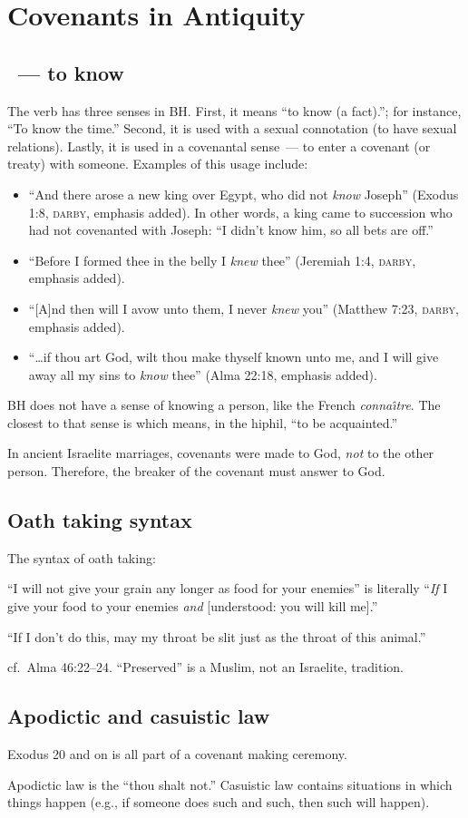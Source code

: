 \section{Covenants in Antiquity}\label{app:covenants-in-antiquity}
\subsection{~--- to know}
The verb  has three senses in BH. First, it means ``to know (a fact).''; for instance, ``To know the time.'' Second, it is used with a sexual connotation (to have sexual relations). Lastly, it is used in a covenantal sense~--- to enter a covenant (or treaty) with someone. Examples of this usage include:
\begin{itemize}
  \item ``And there arose a new king over Egypt, who did not \emph{know} Joseph'' (Exodus 1:8, \textsc{darby}, emphasis added). In other words, a king came to succession who had not covenanted with Joseph: ``I didn't know him, so all bets are off.''
  \item ``Before I formed thee in the belly I \emph{knew} thee'' (Jeremiah 1:4, \textsc{darby}, emphasis added).
  \item ``[A]nd then will I avow unto them, I never \emph{knew} you'' (Matthew 7:23, \textsc{darby}, emphasis added).
  \item ``\dots if thou art God, wilt thou make thyself known unto me, and I will give away all my sins to \emph{know} thee'' (Alma 22:18, emphasis added).
\end{itemize}

BH does not have a sense of knowing a person, like the French \textit{conna\^\i tre}. The closest to that sense is  which means, in the hiphil, ``to be acquainted.''

In ancient Israelite marriages, covenants were made to God, \emph{not} to the other person. Therefore, the breaker of the covenant must answer to God.

\subsection{Oath taking syntax}
The syntax of oath taking:

``I will not give your grain any longer as food for your enemies'' is literally ``\emph{If} I give your food to your enemies \emph{and} [understood: you will kill me].''

``If I don't do this, may my throat be slit just as the throat of this animal.''

cf.\ Alma 46:22--24. ``Preserved'' is a Muslim, not an Israelite, tradition.

\subsection{Apodictic and casuistic law}
Exodus 20 and on is all part of a covenant making ceremony.

Apodictic law is the ``thou shalt not.'' Casuistic law contains situations in which things happen (e.g., if someone does such and such, then such will happen).
